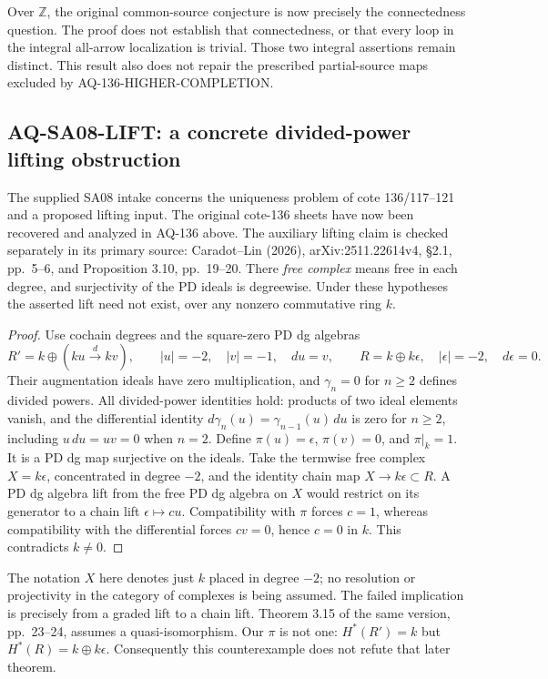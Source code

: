 Over $\mathbb Z$, the original common-source conjecture is
now precisely the connectedness question. The proof does
not establish that connectedness, or that every loop in
the integral all-arrow localization is trivial. Those two
integral assertions remain distinct. This result also does
not repair the prescribed partial-source maps excluded by
AQ-136-HIGHER-COMPLETION.


\subsection{AQ-SA08-LIFT: a concrete divided-power lifting obstruction}
The supplied SA08 intake concerns the uniqueness problem
of cote 136/117--121 and a proposed lifting input.
The original cote-136 sheets have now been recovered and
analyzed in AQ-136 above.  The auxiliary lifting claim
is checked separately in its primary source: Caradot--Lin (2026),
arXiv:2511.22614v4, \S2.1, pp.~5--6, and
Proposition 3.10, pp.~19--20.
There \emph{free complex} means free in each degree,
and surjectivity of the PD ideals is degreewise.
Under these hypotheses the asserted lift need not exist,
over any nonzero commutative ring $k$.
\begin{proof}
Use cochain degrees and the square-zero PD dg algebras
\[
 R'=k\oplus(ku\xrightarrow{\,d\,}kv),\qquad
 |u|=-2,\quad |v|=-1,\quad du=v,
 \qquad R=k\oplus k\epsilon,\quad|\epsilon|=-2,\quad d\epsilon=0.
\]
Their augmentation ideals have zero multiplication,
and $\gamma_n=0$ for $n\geq2$ defines divided powers.
All divided-power identities hold: products of two
ideal elements vanish, and the differential identity
$d\gamma_n(u)=\gamma_{n-1}(u)\,du$ is zero for $n\geq2$,
including $u\,du=uv=0$ when $n=2$.
Define $\pi(u)=\epsilon$, $\pi(v)=0$, and $\pi|_k=1$.
It is a PD dg map surjective on the ideals.
Take the termwise free complex $X=k\epsilon$,
concentrated in degree $-2$, and the identity chain
map $X\to k\epsilon\subset R$.
A PD dg algebra lift from the free PD dg algebra
on $X$ would restrict on its generator to a chain
lift $\epsilon\mapsto cu$.
Compatibility with $\pi$ forces $c=1$, whereas
compatibility with the differential forces $cv=0$,
hence $c=0$ in $k$. This contradicts $k\ne0$.
\end{proof}
The notation $X$ here denotes just $k$ placed in
degree $-2$; no resolution or projectivity in the
category of complexes is being assumed.
The failed implication is precisely from a graded
lift to a chain lift. Theorem 3.15 of the same
version, pp.~23--24, assumes a quasi-isomorphism.
Our $\pi$ is not one:
$H^*(R')=k$ but $H^*(R)=k\oplus k\epsilon$.
Consequently this counterexample does not refute
that later theorem.

